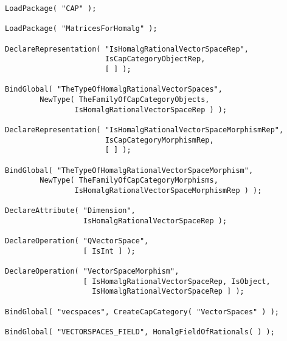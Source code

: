 \begin{small}
\begin{Verbatim}[commandchars=!@\%,frame=single]
LoadPackage( "CAP" );

LoadPackage( "MatricesForHomalg" );

DeclareRepresentation( "IsHomalgRationalVectorSpaceRep",
                       IsCapCategoryObjectRep,
                       [ ] );

BindGlobal( "TheTypeOfHomalgRationalVectorSpaces",
        NewType( TheFamilyOfCapCategoryObjects,
                IsHomalgRationalVectorSpaceRep ) );

DeclareRepresentation( "IsHomalgRationalVectorSpaceMorphismRep",
                       IsCapCategoryMorphismRep,
                       [ ] );

BindGlobal( "TheTypeOfHomalgRationalVectorSpaceMorphism",
        NewType( TheFamilyOfCapCategoryMorphisms,
                IsHomalgRationalVectorSpaceMorphismRep ) );

DeclareAttribute( "Dimension",
                  IsHomalgRationalVectorSpaceRep );

DeclareOperation( "QVectorSpace",
                  [ IsInt ] );

DeclareOperation( "VectorSpaceMorphism",
                  [ IsHomalgRationalVectorSpaceRep, IsObject,
                    IsHomalgRationalVectorSpaceRep ] );

BindGlobal( "vecspaces", CreateCapCategory( "VectorSpaces" ) );

BindGlobal( "VECTORSPACES_FIELD", HomalgFieldOfRationals( ) );

\end{Verbatim}
\end{small}
